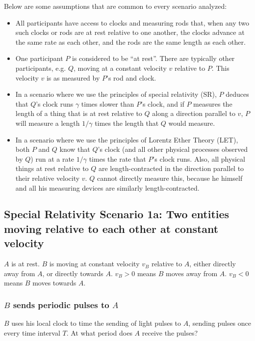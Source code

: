 \documentclass[a4paper]{article}
\theoremstyle{plain}
\theoremstyle{definition}
\begin{document}
Below are some assumptions that are common to every scenario analyzed:
\begin{itemize}
\item All participants have access to clocks and measuring rods that,
  when any two such clocks or rods are at rest relative to one
  another, the clocks advance at the same rate as each other, and the
  rods are the same length as each other.
\item One participant $P$ is considered to be ``at rest''.  There are
  typically other participants, e.g. $Q$, moving at a constant
  velocity $v$ relative to $P$.  This velocity $v$ is as measured by
  $P$'s rod and clock.
\item In a scenario where we use the principles of special relativity
  (SR), $P$ deduces that $Q$'s clock runs $\gamma$ times slower than
  $P$'s clock, and if $P$ measures the length of a thing that is at
  rest relative to $Q$ along a direction parallel to $v$, $P$ will
  measure a length $1/\gamma$ times the length that $Q$ would measure.
\item In a scenario where we use the principles of Lorentz Ether
  Theory (LET), both $P$ and $Q$ know that $Q$'s clock (and all other
  physical processes observed by $Q$) run at a rate $1/\gamma$ times
  the rate that $P$'s clock runs.  Also, all physical things at rest
  relative to $Q$ are length-contracted in the direction parallel to
  their relative velocity $v$.  $Q$ cannot directly measure this,
  because he himself and all his measuring devices are similarly
  length-contracted.
\end{itemize}


\subsection{Special Relativity Scenario 1a: Two entities moving relative to each other at constant velocity}
\label{sec:scen1a}

$A$ is at rest.  $B$ is moving at constant velocity $v_B$ relative to $A$,
either directly away from $A$, or directly towards $A$.
$v_B > 0$ means $B$ moves away from $A$.
$v_B < 0$ means $B$ moves towards $A$.


\subsubsection{$B$ sends periodic pulses to $A$}
\label{sec:scen1a-BtoA}

$B$ uses his local clock to time the sending of light pulses to $A$,
sending pulses once every time interval $T$.
At what period does $A$ receive the pulses?
\end{document}
